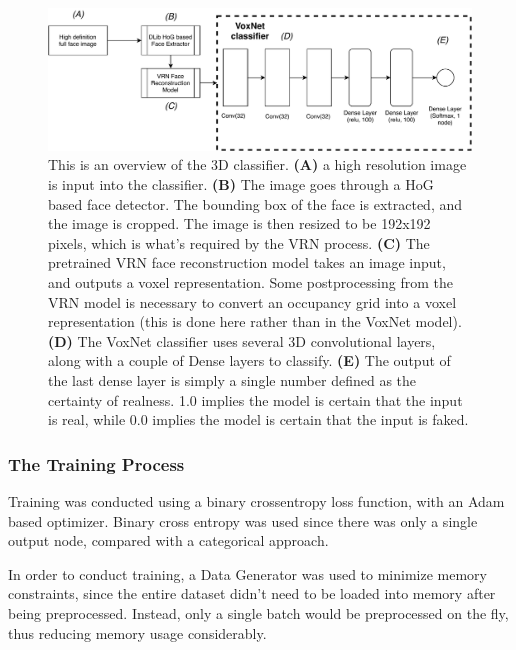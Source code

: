 \documentclass[11pt,a4paper]{article}
\begin{document}
            \begin{figure}
                \centering
                \includegraphics[width=\linewidth]{voxnet.pdf}
                \caption{
                    This is an overview of the 3D classifier. \textbf{(A)} a high resolution image is input into the classifier. \textbf{(B)} The image goes through a HoG based face detector. The bounding box of the face is extracted, and the image is cropped. 
                    The image is then resized to be 192x192 pixels, which is what's required by the VRN process.
                    \textbf{(C)} The pretrained VRN face reconstruction model takes an image input, and outputs a voxel representation. Some postprocessing from the VRN model 
                    is necessary to convert an occupancy grid into a voxel representation (this is done here rather than in the VoxNet model).
                    \textbf{(D)} The VoxNet classifier uses several 3D convolutional layers, along with a couple of Dense layers to classify.
                    \textbf{(E)} The output of the last dense layer is simply a single number defined as the certainty of realness. 1.0 implies the model is certain that the input is real, while 0.0 implies the model is certain that the input is faked.
                }
                \label{3DClassifierArchitectureDiagram}
            \end{figure}

        \subsubsection{The Training Process}
            Training was conducted using a binary crossentropy loss function, with an Adam based optimizer. Binary cross entropy was used since there was only a single output node,
            compared with a categorical approach. 

            In order to conduct training, a Data Generator was used to minimize memory constraints, since the entire dataset didn't need to be loaded into memory after being preprocessed. Instead,
            only a single batch would be preprocessed on the fly, thus reducing memory usage considerably.
\end{document}
